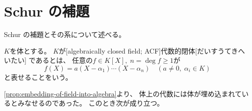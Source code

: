 \documentclass[report]{jlreq}
\begin{document}
%
\section{Schur の補題}

Schur の補題とその系について述べる。

\begin{definition}[代数的閉体]
    $K$を体とする。
    $K$が[algebraically closed field; ACF]{代数的閉体}[だいすうてきへいたい]
    であるとは、
    任意の$f \in K[X], \; n = \deg f \ge 1$が
    \begin{equation}
        f(X) = a(X - \alpha_1) \cdots (X - \alpha_n)
            \quad
            (a \neq 0, \; \alpha_i \in K)
    \end{equation}
    と表せることをいう。
\end{definition}

\cref{prop:embedding-of-field-into-algebra}より、
体上の代数には体が埋め込まれているとみなせるのであった。
このとき次が成り立つ。

\end{document}
